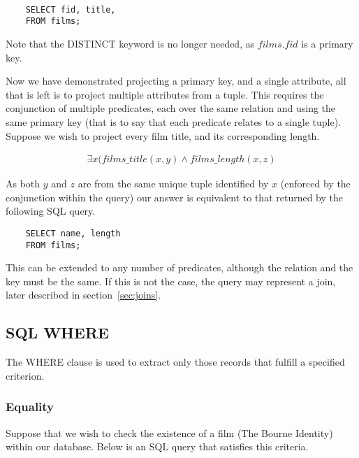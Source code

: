 \documentclass[a4paper, 11pt]{article}
\begin{document}
    \begin{verbatim}

    SELECT fid, title,
    FROM films;

    \end{verbatim}

    Note that the DISTINCT keyword is no longer needed, as $films.fid$ is a
    primary key.

    Now we have demonstrated projecting a primary key, and a single attribute,
    all that is left is to project multiple attributes from a tuple. This
    requires the conjunction of multiple predicates, each over the same
    relation and using the same primary key (that is to say that each predicate
    relates to a single tuple). Suppose we wish to project
    every film title, and its corresponding length.

    \begin{gather}
      \exists x(films\_title(x, y) \land films\_length(x, z)
    \end{gather}

    As both $y$ and $z$ are from the same unique tuple identified by $x$
    (enforced by the conjunction within the query) our
    answer is equivalent to that returned by the following SQL query.

    \begin{verbatim}
    SELECT name, length
    FROM films;
    \end{verbatim}

    This can be extended to any number of predicates, although the relation and
    the key must be the same. If this is not the case, the query may represent
    a join, later described in section~\ref{sec:joins}.

  \subsection{SQL WHERE}

    The WHERE clause is used to extract only those records that fulfill a
    specified criterion.~\cite{w3WHERE} 

    \subsubsection{Equality}

      Suppose that we wish to check the existence of a film (The Bourne
      Identity) within our database. Below is an SQL query that satisfies this
      criteria.
\end{document}
